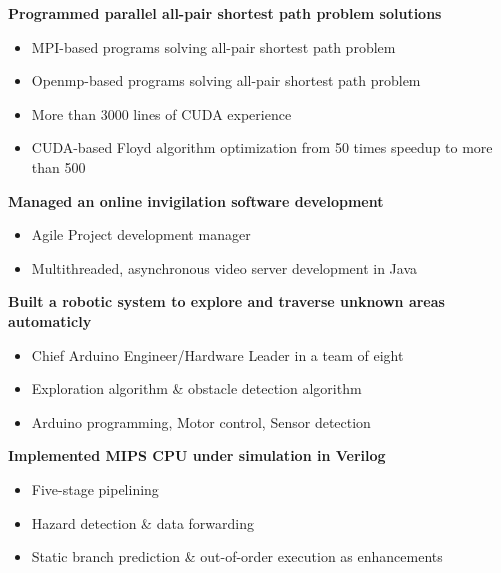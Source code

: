 \documentclass[a4paper, 12pt]{article}
\newenvironment{changemargin}[2]{%
  \begin{list}{}{%
      \setlength{\topsep}{0pt}%
      \setlength{\leftmargin}{#1}%
      \setlength{\rightmargin}{#2}%
      \setlength{\listparindent}{\parindent}%
      \setlength{\itemindent}{\parindent}%
      \setlength{\parsep}{\parskip}%
    }%
  \item[]}{\end{list}
}
\newenvironment{body}
{
\vspace*{-16pt}
\begin{changemargin}{-0.25in}{-0.5in}
}
{
\end{changemargin}
}
\begin{document}
\begin{body}
  \vspace{14pt}
  \textbf{Programmed parallel all-pair shortest path problem solutions}\\
  \vspace*{-6pt}
    \begin{itemize} \itemsep -0pt \small
        \item MPI-based programs solving all-pair shortest path problem
        \item Openmp-based programs solving all-pair shortest path problem
        \item More than 3000 lines of CUDA experience
        \item CUDA-based Floyd algorithm optimization from 50 times speedup to more than 500
    \end{itemize}
  \textbf{Managed an online invigilation software development}\\
  \vspace*{-6pt}
    \begin{itemize} \itemsep -0pt \small
        \item Agile Project development manager
        \item Multithreaded, asynchronous video server development in Java
    \end{itemize}
  \textbf{Built a robotic system to explore and traverse unknown areas automaticly}\\
  \vspace*{-6pt}
    \begin{itemize} \itemsep -0pt \small
        \item Chief Arduino Engineer/Hardware Leader in a team of eight
        \item Exploration algorithm \& obstacle detection algorithm
        \item Arduino programming, Motor control, Sensor detection
    \end{itemize}
  \textbf{Implemented MIPS CPU under simulation in Verilog}\\
  \vspace*{-6pt}
    \begin{itemize} \itemsep -0pt \small
        \item Five-stage pipelining
        \item Hazard detection \& data forwarding
        \item Static branch prediction \& out-of-order execution as enhancements
    \end{itemize}


\end{body}
\end{document}
